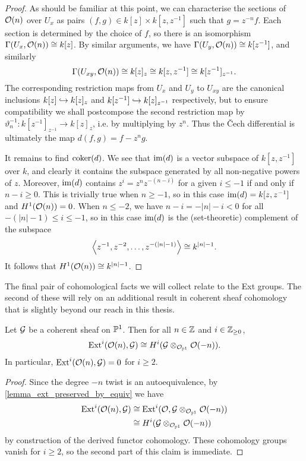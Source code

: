 \begin{proof}
  As should be familiar at this point, we can characterise the
  sections of $\mathcal{O}({n})$ over $U_x$ as pairs $(f, g) \in k[z] \times
  k[z, z^{-1}]$ such that $g = z^{-n} f$.
  Each section is determined by the choice of $f$, so there is an
  isomorphism $\Gamma({U_x}, {\mathcal{O}({n})}) \cong k[z]$.
  By similar arguments, we have $\Gamma({U_y}, {\mathcal{O}({n})}) \cong
  k[z^{-1}]$, and similarly
  \[
    \Gamma({U_{xy}}, {\mathcal{O}({n})}) \cong k[z]_z \cong k[z, z^{-1}]
    \cong k[z^{-1}]_{z^{-1}}.
  \]
  The corresponding restriction maps from $U_x$ and $U_y$ to $U_{xy}$
  are the canonical inclusions $k[z] \hookrightarrow k[z]_z$ and $k[z^{-1}]
  \hookrightarrow k[z]_{z^{-1}}$ respectively, but to ensure compatibility we
  shall postcompose the second restriction map by $\vartheta_n^{-1}:
  k[z^{-1}]_{z^{-1}} \to k[z]_z$, i.e. by multiplying by $z^n$.
  Thus the \v{C}ech differential is ultimately the map $d(f, g) = f - z^n g$.

  It remains to find $\operatorname{coker}(d)$.
  We see that $\operatorname{im}(d)$ is a vector subspace of $k[z, z^{-1}]$ over
  $k$, and clearly it contains the subspace generated by all
  non-negative powers of $z$.
  Moreover, $\operatorname{im}(d)$ contains $z^i = z^{n} z^{-(n - i)}$ for a given
  $i \leq -1$ if and only if $n - i \geq 0$.
  This is trivially true when $n \geq -1$,
  so in this case $\operatorname{im}(d) = k[z, z^{-1}]$ and $H^1(\mathcal{O}({n})) = 0$.
  When $n \leq -2$, we have $n - i = -|n| - i < 0$ for all $-(|n| -
  1) \leq i \leq -1$, so in this case $\operatorname{im}(d)$ is the (set-theoretic)
  complement of the subspace
  \[
    \left\langle {z^{-1}, z^{-2}, \ldots, z^{-(|n| - 1)}} \right\rangle \cong k^{|n| - 1}.
  \]
  It follows that $H^1(\mathcal{O}({n})) \cong k^{|n| - 1}$.
\end{proof}

The final pair of cohomological facts we will collect relate to the Ext groups.
The second of these will rely on an additional result in coherent
sheaf cohomology that is slightly beyond our reach in this thesis.

\begin{lemma}
  \label{prop_ext_from_twist}
  Let $\mathcal{G}$ be a coherent sheaf on $\mathbb{P}^{{1}}$.
  Then for all $n \in \mathbb{Z}$ and $i \in \mathbb{Z}_{\geq 0}$,
  \[
    \operatorname{Ext}^{{i}}(\mathcal{O}({n}), \mathcal{G}) \cong H^i(\mathcal{G} \otimes_{\mathcal{O}_{{\mathbb{P}^{{1}}}}} \mathcal{O}({-n})).
  \]
  In particular, $\operatorname{Ext}^{{i}}(\mathcal{O}({n}), \mathcal{G}) = 0$ for $i \geq 2$.
\end{lemma}

\begin{proof}
  Since the degree $-n$ twist is an autoequivalence, by
  \cref{lemma_ext_preserved_by_equiv} we have
  \begin{align*}
    \operatorname{Ext}^{{i}}(\mathcal{O}({n}), \mathcal{G})
    &\cong \operatorname{Ext}^{{i}}(\mathcal{O}, \mathcal{G} \otimes_{\mathcal{O}_{{\mathbb{P}^{{1}}}}} \mathcal{O}({-n})) \\
    &\cong H^i(\mathcal{G} \otimes_{\mathcal{O}_{{\mathbb{P}^{{1}}}}} \mathcal{O}({-n}))
  \end{align*}
  by construction of the derived functor cohomology.
  These cohomology groups vanish for $i \geq 2$, so the second part
  of this claim is immediate.
\end{proof}

